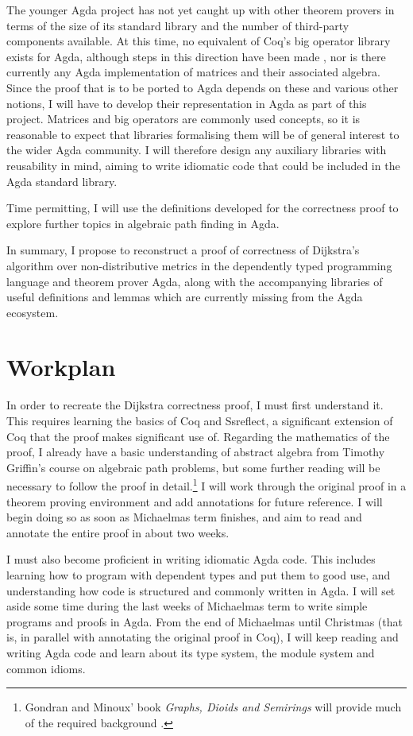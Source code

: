 \documentclass[a4paper]{scrartcl}
\begin{document}
The younger Agda project has not yet caught up with other theorem provers in terms of the size of its standard library and the number of third-party components available. At this time, no equivalent of Coq's big operator library exists for Agda, although steps in this direction have been made \autocite{gustafsson_foldable_2014}, nor is there currently any Agda implementation of matrices and their associated algebra.  Since the proof that is to be ported to Agda depends on these and various other notions, I will have to develop their representation in Agda as part of this project. Matrices and big operators are commonly used concepts, so it is reasonable to expect that libraries formalising them will be of general interest to the wider Agda community. I will therefore design any auxiliary libraries with reusability in mind, aiming to write idiomatic code that could be included in the Agda standard library.

Time permitting, I will use the definitions developed for the correctness proof to explore further topics in algebraic path finding in Agda.

In summary, I propose to reconstruct a proof of correctness of Dijkstra's algorithm over non-distributive metrics in the dependently typed programming language and theorem prover Agda, along with the accompanying libraries of useful definitions and lemmas which are currently missing from the Agda ecosystem.

\section{Workplan}
\label{workplan}

In order to recreate the Dijkstra correctness proof, I must first understand it. This requires learning the basics of Coq and Ssreflect, a significant extension of Coq that the proof makes significant use of. Regarding the mathematics of the proof, I already have a basic understanding of abstract algebra from Timothy Griffin's course on algebraic path problems, but some further reading will be necessary to follow the proof in detail.\footnote{Gondran and Minoux' book \emph{Graphs, Dioids and Semirings} will provide much of the required background \autocite{gondran_graphs_2008}.}
I will work through the original proof in a theorem proving environment and add annotations for future reference. I will begin doing so as soon as Michaelmas term finishes, and aim to read and annotate the entire proof in about two weeks.

I must also become proficient in writing idiomatic Agda code.
This includes learning how to program with dependent types and put them to good use, and understanding how code is structured and commonly written in Agda.
I will set aside some time during the last weeks of Michaelmas term to write simple programs and proofs in Agda.
From the end of Michaelmas until Christmas (that is, in parallel with annotating the original proof in Coq), I will keep reading and writing Agda code and learn about its type system, the module system and common idioms.
\end{document}
